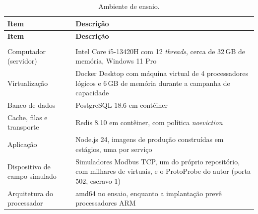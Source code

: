 {\renewcommand{\arraystretch}{1.3}\small
\begin{xltabular}{\textwidth}{lX}
        \caption{Ambiente de ensaio.}
        \label{tab:cap7_ambiente}\\
        \hline
        \textbf{Item} & \textbf{Descrição} \\
        \hline
        \endfirsthead
        \hline
        \textbf{Item} & \textbf{Descrição} \\
        \hline
        \endhead
        \endfoot
         \\
        \endlastfoot
        Computador (servidor) & Intel Core i5-13420H com 12 \emph{threads}, cerca de 32\,GB de memória, Windows 11 Pro \\
        \hline
        Virtualização & Docker Desktop com máquina virtual de 4 processadores lógicos e 6\,GB de memória durante a campanha de capacidade \\
        \hline
        Banco de dados & PostgreSQL 18.6 em contêiner \\
        \hline
        Cache, filas e transporte & Redis 8.10 em contêiner, com política \emph{noeviction} \\
        \hline
        Aplicação & Node.js 24, imagens de produção construídas em estágios, uma por serviço \\
        \hline
        Dispositivo de campo simulado & Simuladores Modbus TCP, um do próprio repositório, com milhares de  virtuais, e o ProtoProbe do autor (porta 502, escravo 1) \\
        \hline
        Arquitetura do processador & amd64 no ensaio, enquanto a implantação prevê processadores ARM \\
        \hline
\end{xltabular}}

